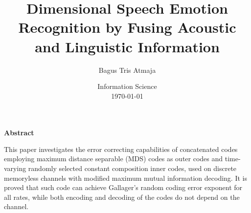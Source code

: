 \documentclass[12pt]{report}
\title{%
Dimensional Speech Emotion Recognition by Fusing Acoustic and Linguistic Information}
\author{Bagus Tris Atmaja}
\date{Information Science \\ \today}
\begin{document}
\maketitle

\setcounter{page}{1}

\strut
\vspace{20pt}

\begin{center}
{\LARGE\bf Abstract}
\end{center}
\vspace{20pt}

This paper investigates the error 
correcting capabilities of concatenated codes 
employing maximum distance separable (MDS) codes as outer codes and
time-varying randomly selected constant composition inner codes,
used on discrete memoryless channels with modified maximum mutual 
information decoding. It is proved that such code
can achieve Gallager's random coding error exponent
for all rates, while both encoding and decoding of the codes do not
depend on the channel. 



\tableofcontents
\listoffigures
\listoftables
\newpage
{}
\setcounter{page}{1}







\end{document}
